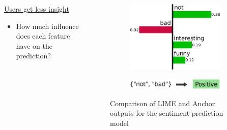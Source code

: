\documentclass[aspectratio=169]{slide-ja}
\begin{document}
\begin{frame}{}
  \begin{columns}[]
    \begin{column}{0.45\textwidth}
      \underline{Users get less insight}

      \bigskip
      \begin{itemize}
        \item How much influence does each feature have on the prediction?
      \end{itemize}
    \end{column}
    \begin{column}{0.5\textwidth}
      \begin{figure}
        \begin{subfigure}[t]{\textwidth}
          \centering
          \includegraphics[scale=0.4]{example-lime}
        \end{subfigure}
        \begin{subfigure}[t]{\textwidth}
          \centering
          \vspace{0.5em}
          \includegraphics[scale=0.4]{example-anchor}
        \end{subfigure}
        \vspace{0.5em}
        \caption{Comparison of LIME and Anchor outputs for the sentiment prediction model}
      \end{figure}
    \end{column}
  \end{columns}
\end{frame}
\end{document}
